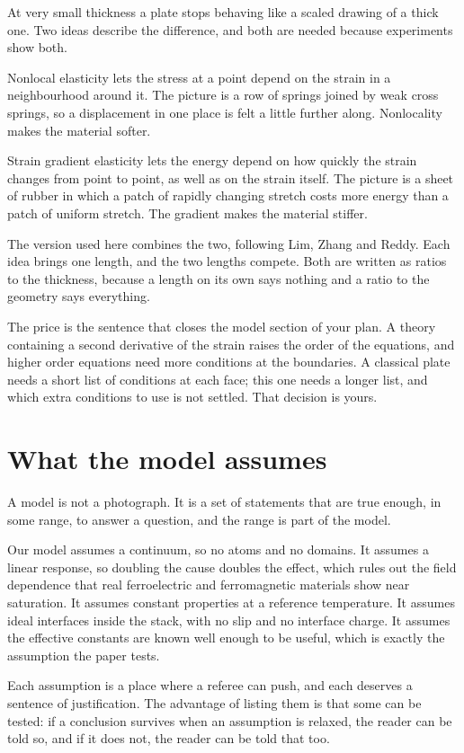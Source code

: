 \documentclass[11pt]{article}
\begin{document}
At very small thickness a plate stops behaving like a scaled drawing of a thick one. Two ideas describe the
difference, and both are needed because experiments show both.

Nonlocal elasticity lets the stress at a point depend on the strain in a neighbourhood around it. The picture
is a row of springs joined by weak cross springs, so a displacement in one place is felt a little further
along. Nonlocality makes the material softer.

Strain gradient elasticity lets the energy depend on how quickly the strain changes from point to point, as
well as on the strain itself. The picture is a sheet of rubber in which a patch of rapidly changing stretch
costs more energy than a patch of uniform stretch. The gradient makes the material stiffer.

The version used here combines the two, following Lim, Zhang and Reddy. Each idea brings one length, and the
two lengths compete. Both are written as ratios to the thickness, because a length on its own says nothing and
a ratio to the geometry says everything.

The price is the sentence that closes the model section of your plan. A theory containing a second derivative
of the strain raises the order of the equations, and higher order equations need more conditions at the
boundaries. A classical plate needs a short list of conditions at each face; this one needs a longer list, and
which extra conditions to use is not settled. That decision is yours.

\section{What the model assumes}

A model is not a photograph. It is a set of statements that are true enough, in some range, to answer a
question, and the range is part of the model.

Our model assumes a continuum, so no atoms and no domains. It assumes a linear response, so doubling the cause
doubles the effect, which rules out the field dependence that real ferroelectric and ferromagnetic materials
show near saturation. It assumes constant properties at a reference temperature. It assumes ideal interfaces
inside the stack, with no slip and no interface charge. It assumes the effective constants are known well
enough to be useful, which is exactly the assumption the paper tests.

Each assumption is a place where a referee can push, and each deserves a sentence of justification. The
advantage of listing them is that some can be tested: if a conclusion survives when an assumption is relaxed,
the reader can be told so, and if it does not, the reader can be told that too.
\end{document}
